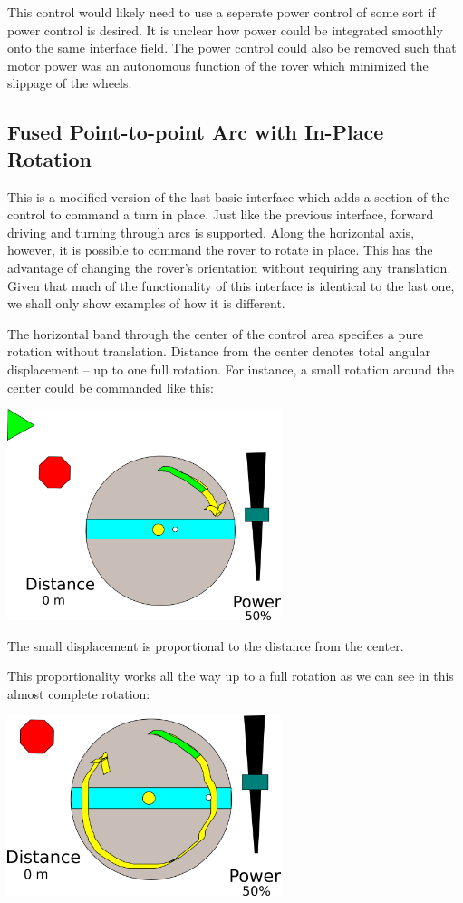 \documentclass[letterpaper,10pt]{article}
\begin{document}
    This control would likely need to use a seperate power control of some sort if power control is desired.  It is unclear how power could be integrated smoothly onto the same interface field.  The power control could also be removed such that motor power was an autonomous function of the rover which minimized the slippage of the wheels.
    
  \subsection{Fused Point-to-point Arc with In-Place Rotation}
    This is a modified version of the last basic interface which adds a section of the control to command a turn in place.  Just like the previous interface, forward driving and turning through arcs is supported.  Along the horizontal axis, however, it is possible to command the rover to rotate in place.  This has the advantage of changing the rover's orientation without requiring any translation.  Given that much of the functionality of this interface is identical to the last one, we shall only show examples of how it is different.
    
    The horizontal band through the center of the control area specifies a pure rotation without translation.  Distance from the center denotes total angular displacement -- up to one full rotation.  For instance, a small rotation around the center could be commanded like this:
    
    \includegraphics[width=8cm]{fused_arc_pivot}
    
    The small displacement is proportional to the distance from the center.
    
    
    This proportionality works all the way up to a full rotation as we can see in this almost complete rotation:
    
    \includegraphics[width=8cm]{fused_arc_pivot_more}    
    
\end{document}
